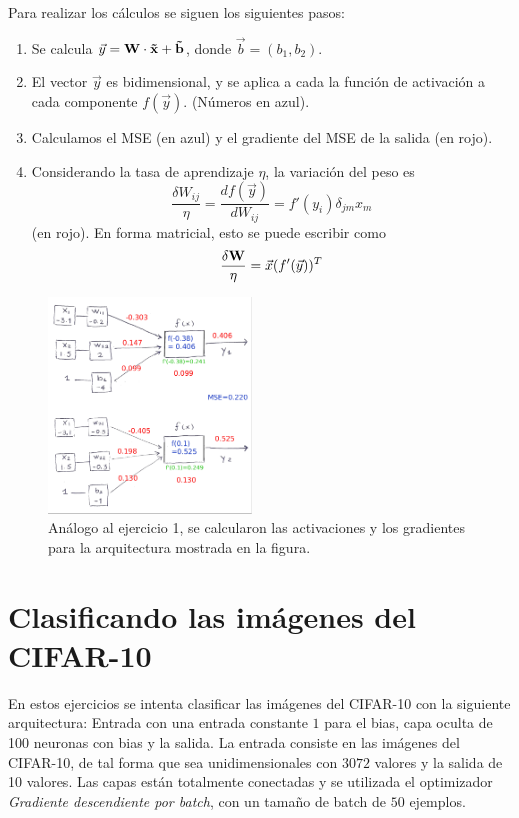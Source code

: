 Para realizar los cálculos se siguen los siguientes pasos:

\begin{enumerate}
    \item Se calcula $\vec y = \bf{W} \cdot \vec x + \vec b$, donde $\vec b = (b_1, b_2)$.
    \item El vector $\vec y$ es bidimensional, y se aplica a cada la función de activación a cada componente $f(\vec y)$. (Números en azul).
    \item Calculamos el MSE (en azul) y el gradiente del MSE de la salida (en rojo).
    \item Considerando la tasa de aprendizaje $\eta$,  la variación del peso es
    \[ \frac{\delta W_{ij}}{\eta} = \frac{df(\vec y)}{d W_{ij}} = f'(y_i)\delta_{jm}  x_m \]
    (en rojo). En forma matricial, esto se puede escribir como 
    \[\frac{\delta \bf{W}}{\eta} = \vec x (f'(\vec y))^T\]
\end{enumerate}


\begin{figure}[H]
    \begin{small}
        \begin{center}
            \includegraphics[width=0.482\textwidth]{Graphs/ejer2_grafico.pdf}
        \end{center}
        \caption{Análogo al ejercicio 1, se calcularon las activaciones y los gradientes para la arquitectura mostrada en la figura.}
        \label{fig:}
    \end{small}
\end{figure}

\section*{Clasificando las imágenes del CIFAR-10}


En estos ejercicios se intenta clasificar las imágenes del CIFAR-10 con la siguiente arquitectura:  Entrada con una entrada constante $1$ para el bias, capa oculta de 100 neuronas con bias y la salida. La entrada consiste en las imágenes del CIFAR-10, de tal forma que sea unidimensionales con $3072$ valores y la salida de 10 valores. Las capas están totalmente conectadas y se utilizada el optimizador \emph{Gradiente descendiente por batch}, con un tamaño de batch  de $50$ ejemplos.

